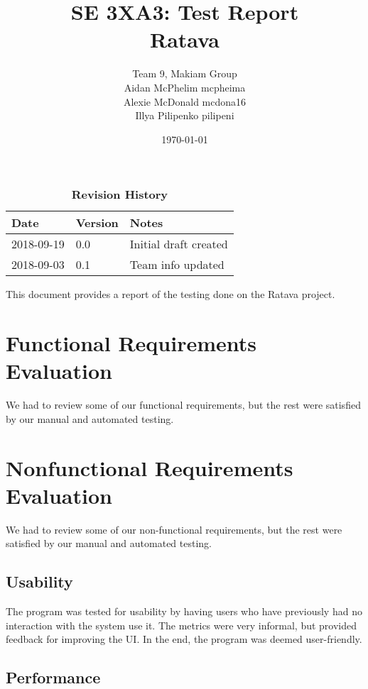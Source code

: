 \documentclass[12pt, titlepage]{article}
\title{SE 3XA3: Test Report\\Ratava}
\author{Team 9, Makiam Group
		\\ Aidan McPhelim \- mcpheima
		\\ Alexie McDonald \- mcdona16
		\\ Illya Pilipenko \- pilipeni
}
\date{\today}
\begin{document}
\maketitle

\tableofcontents
\listoftables
\listoffigures

\begin{table}[bp]
\caption{\bf Revision History}
\begin{tabularx}{\textwidth}{p{3cm}p{2cm}X}
\toprule {\bf Date} & {\bf Version} & {\bf Notes}\\
\midrule
2018-09-19 & 0.0 & Initial draft created\\
2018-09-03 & 0.1 & Team info updated\\
\bottomrule
\end{tabularx}
\end{table}

\newpage


This document provides a report of the testing done on the Ratava project.

\section{Functional Requirements Evaluation}

We had to review some of our functional requirements, but the rest were satisfied by our manual and automated testing.

\section{Nonfunctional Requirements Evaluation}

We had to review some of our non-functional requirements, but the rest were satisfied by our manual and automated testing.

\subsection{Usability}

The program was tested for usability by having users who have previously had no interaction with the system use it. The metrics were very informal, but provided feedback for improving the UI. In the end, the program was deemed user-friendly.

\subsection{Performance}
\end{document}
